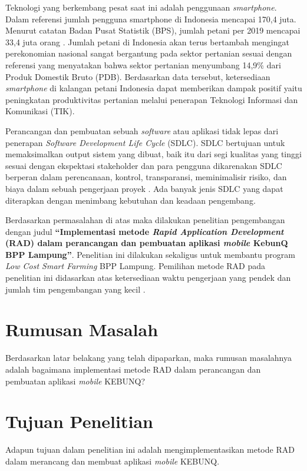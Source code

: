 \begin{flushleft}
\begin{justify}
    Teknologi yang berkembang pesat saat ini adalah penggunaan \textit{smartphone}. Dalam referensi \cite{web-datasmartphone} 
    jumlah pengguna smartphone di Indonesia mencapai 170,4 juta. Menurut catatan Badan Pusat Statistik (BPS), jumlah petani per 2019 mencapai 33,4 juta orang \cite{databps}. 
    Jumlah petani di Indonesia akan terus bertambah mengingat perekonomian nasional sangat bergantung pada sektor pertanian sesuai dengan 
    referensi \cite{jurnal-kajianAplikasi} yang menyatakan bahwa sektor pertanian menyumbang 14,9\% dari Produk Domestik Bruto (PDB). Berdasarkan data tersebut, ketersediaan \textit{smartphone} di kalangan petani Indonesia dapat memberikan dampak positif yaitu peningkatan produktivitas pertanian melalui penerapan Teknologi Informasi dan  Komunikasi (TIK). 

    Perancangan dan pembuatan sebuah \emph{software} atau aplikasi tidak lepas dari penerapan \emph{Software Development Life Cycle} (SDLC). SDLC bertujuan untuk memaksimalkan output sistem yang dibuat, baik itu dari segi kualitas yang tinggi sesuai dengan ekspektasi stakeholder dan para pengguna \cite{sdlc} dikarenakan SDLC berperan dalam perencanaan, kontrol, transparansi, meminimalisir risiko, dan biaya dalam sebuah pengerjaan proyek \cite{sdlc2}. Ada banyak jenis SDLC yang dapat diterapkan dengan menimbang kebutuhan dan keadaan pengembang.

    Berdasarkan permasalahan di atas maka dilakukan penelitian pengembangan dengan judul \textbf{“Implementasi metode \textit{Rapid Application Development} (RAD) dalam perancangan dan pembuatan aplikasi \textit{mobile} KebunQ BPP Lampung”}.  Penelitian ini dilakukan sekaligus untuk membantu program \textit{Low Cost Smart Farming} BPP Lampung. Pemilihan metode RAD pada penelitian ini didasarkan atas ketersediaan waktu pengerjaan yang pendek \cite{Sukamto} dan jumlah tim pengembangan yang kecil \cite{jurnal empiris}.
\\

    \section{Rumusan Masalah}
      Berdasarkan latar belakang yang telah dipaparkan, maka rumusan masalahnya adalah bagaimana implementasi metode RAD dalam perancangan dan pembuatan aplikasi \textit{mobile} KEBUNQ?
      \\
    \section{Tujuan Penelitian}
      Adapun tujuan dalam penelitian ini adalah mengimplementasikan metode RAD dalam merancang dan membuat aplikasi \textit{mobile} KEBUNQ.
      \\

\end{justify}
\end{flushleft}
